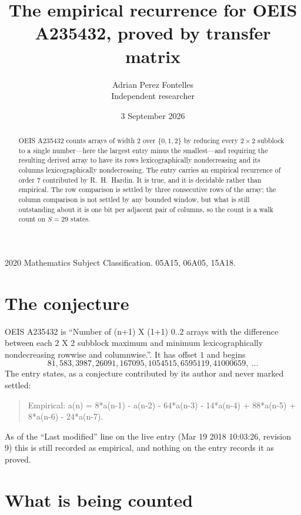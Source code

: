 \documentclass[11pt,a4paper]{article}
\title{The empirical recurrence for OEIS A235432, proved by transfer matrix}
\author{Adrian Perez Fontelles\\ \small Independent researcher}
\date{3 September 2026}
\theoremstyle{plain}
\theoremstyle{definition}
\begin{document}
\maketitle

\begin{abstract}
OEIS A235432 counts arrays of width $2$ over $\{0,1,2\}$ by reducing every $2\times2$ subblock to a
single number---here the largest entry minus the smallest---and requiring the resulting derived array to have its rows
lexicographically nondecreasing and its columns lexicographically nondecreasing. The entry carries an
empirical recurrence of order $7$ contributed by R.~H.~Hardin. It is true, and it is
decidable rather than empirical. The row comparison is settled by three consecutive rows of the
array; the column comparison is not settled by any bounded window, but what is still outstanding
about it is one bit per adjacent pair of columns, so the count is a walk count on $S=29$
states.
\end{abstract}

\noindent\small 2020 Mathematics Subject Classification. 05A15, 06A05, 15A18.\normalsize

\section{The conjecture}

OEIS A235432 is ``Number of (n+1) X (1+1) 0..2 arrays with the difference between each 2 X 2 subblock maximum and minimum lexicographically nondecreasing rowwise and columnwise.''. It has offset $1$ and begins
\[
81, 583, 3987, 26091, 167095, 1054515, 6595119, 41000659,\ \dots
\]
The entry states, as a conjecture contributed by its author and never marked settled:
\begin{quote}
Empirical: a(n) = 8*a(n-1) - a(n-2) - 64*a(n-3) - 14*a(n-4) + 88*a(n-5) + 8*a(n-6) - 24*a(n-7).
\end{quote}
As of the ``Last modified'' line on the live entry (Mar 19 2018 10:03:26, revision 9) this is still
recorded as empirical, and nothing on the entry records it as proved.

\section{What is being counted}
\end{document}
